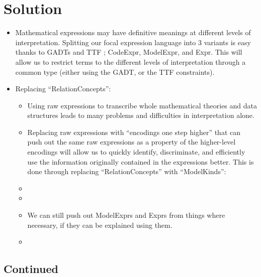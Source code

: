 \section{Solution}

\begin{itemize}

	\item Mathematical expressions may have definitive meanings at different
	      levels of interpretation. Splitting our focal expression language into
	      3 variants is easy thanks to GADTs and TTF \cite{Carette2009};
	      CodeExpr, ModelExpr, and Expr. This will allow us to restrict terms to
	      the different levels of interpretation through a common type (either
	      using the GADT, or the TTF constraints).

	\item Replacing ``RelationConcepts'':

	      \begin{itemize}

		      \item Using raw expressions to transcribe whole mathematical
		            theories and data structures leads to many problems and
		            difficulties in interpretation alone.

		      \item Replacing raw expressions with ``encodings one step higher''
		            that can push out the same raw expressions as a property of
		            the higher-level encodings will allow us to quickly
		            identify, discriminate, and efficiently use the information
		            originally contained in the expressions better. This is done
		            through replacing ``RelationConcepts'' with ``ModelKinds'':

		      \item \currentModelKindsHaskell

		      \item {}

			  \item We can still push out ModelExprs and Exprs from things where
	         		necessary, if they can be explained using them.

			  \item {}

	      \end{itemize}

\end{itemize}

\subsection{Continued}

